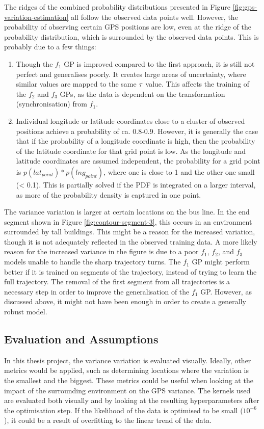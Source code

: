 The ridges of the combined probability distributions presented in Figure \ref{fig:gps-variation-estimation} all follow the observed data points well.
However, the probability of observing certain GPS positions are low, even at the ridge of the probability distribution, which is surrounded by the observed data points.
This is probably due to a few things:
    \begin{enumerate}
        \item Though the $f_1$ GP is improved compared to the first approach, it is still not perfect and generalises poorly.
        It creates large areas of uncertainty, where similar values are mapped to the same $\tau$ value.
        This affects the training of the $f_2$ and $f_3$ GPs, as the data is dependent on the transformation (synchronisation) from $f_1$.

        \item Individual longitude or latitude coordinates close to a cluster of observed positions achieve a probability of ca. 0.8-0.9.
        However, it is generally the case that if the probability of a longitude coordinate is high, then the probability of the latitude coordinate for that grid point is low.
        As the longitude and latitude coordinates are assumed independent, the probability for a grid point is $p(lat_{point}) * p(lng_{point})$, where one is close to 1 and the other one small (< 0.1).
        This is partially solved if the PDF is integrated on a larger interval, as more of the probability density is captured in one point.
    \end{enumerate}

The variance variation is larger at certain locations on the bus line.
In the end segment shown in Figure \ref{fig:contour-segment-3}, this occurs in an environment surrounded by tall buildings.
This might be a reason for the increased variation, though it is not adequately reflected in the observed training data.
A more likely reason for the increased variance in the figure is due to a poor $f_1$, $f_2$, and $f_3$ models unable to handle the sharp trajectory turns.  
The $f_1$ GP might perform better if it is trained on segments of the trajectory, instead of trying to learn the full trajectory.
The removal of the first segment from all trajectories is a necessary step in order to improve the generalisation of the $f_1$ GP.
However, as discussed above, it might not have been enough in order to create a generally robust model.

\subsection{Evaluation and Assumptions}
In this thesis project, the variance variation is evaluated visually.
Ideally, other metrics would be applied, such as determining locations where the variation is the smallest and the biggest.
These metrics could be useful when looking at the impact of the surrounding environment on the GPS variance.
The kernels used are evaluated both visually and by looking at the resulting hyperparameters after the optimisation step.
If the likelihood of the data is optimised to be small ($10^{-6}$), it could be a result of overfitting to the linear trend of the data.

